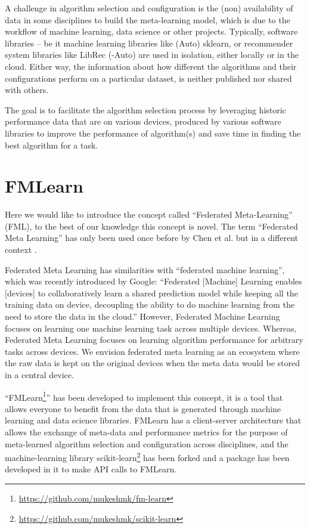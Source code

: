 \documentclass{article}
\begin{document}
A challenge in algorithm selection and configuration is the (non) availability of data in some disciplines to build the meta-learning model, which is due to the workflow of machine learning, data science or other projects. Typically, software libraries – be it machine learning libraries like (Auto) sklearn, or recommender system libraries like LibRec (-Auto) are used in isolation, either locally or in the cloud. Either way, the information about how different the algorithms and their configurations perform on a particular dataset, is neither published nor shared with others.

The goal is to facilitate the algorithm selection process by leveraging historic performance data that are on various devices, produced by various software libraries to improve the performance of algorithm(s) and save time in finding the best algorithm for a task.


\section{FMLearn}

Here we would like to introduce the concept called “Federated Meta-Learning” (FML), to the best of our knowledge this concept is novel. The term “Federated Meta Learning” has only been used once before by Chen et al. but in a different context \cite{chen-et-al}. 

Federated Meta Learning has similarities with “federated machine learning”, which was recently introduced by Google: “Federated [Machine] Learning enables [devices] to collaboratively learn a shared prediction model while keeping all the training data on device, decoupling the ability to do machine learning from the need to store the data in the cloud.”\cite{brendan-et-al} However, Federated Machine Learning focuses on learning one machine learning task across multiple devices. Whereas, Federated Meta Learning focuses on learning algorithm performance for arbitrary tasks across devices. We envision federated meta learning as an ecosystem where the raw data is kept on the original devices when the meta data would be stored in a central device. 

“FMLearn\footnote{\url{https://github.com/mukeshmk/fm-learn}}” has been developed to implement this concept, it is a tool that allows everyone to benefit from the data that is generated through machine learning and data science libraries. FMLearn has a client-server architecture that allows the exchange of meta-data and performance metrics for the purpose of meta-learned algorithm selection and configuration across disciplines, and the machine-learning library scikit-learn\footnote{\url{https://github.com/mukeshmk/scikit-learn}} has been forked and a package has been developed in it to make API calls to FMLearn.
\end{document}
